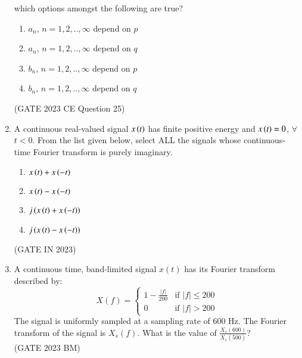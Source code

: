 \begin{enumerate}[label=\thechapter.\arabic*,ref=\thechapter.\theenumi]
which options amongst the following are true?
\begin{enumerate}[label=(\alph*)]
    \item $a_n$, $n=1,2,..,\infty$ depend on $p$
    \item $a_n$, $n=1,2,..,\infty$ depend on $q$
    \item $b_n$, $n=1,2,..,\infty$ depend on $p$
    \item $b_n$, $n=1,2,..,\infty$ depend on $q$
\end{enumerate}
\hfill(GATE 2023 CE Question 25)\\
\solution
\newpage
\item A continuous real-valued signal $x\left(t\right)$ has finite positive energy and $x\left(t\right) = 0$, $\forall$ $t < 0$. From the list given below, select ALL the signals whose
continuous-time Fourier transform is purely imaginary.\\
\begin{enumerate}
\item$x\left(t\right) + x\left(-t\right)$
\item$x\left(t\right) - x\left(-t\right)$
\item$j\left(x\left(t\right) + x\left(-t\right)\right)$
\item$j\left(x\left(t\right) - x\left(-t\right)\right)$
\end{enumerate}
\hfill{(GATE IN 2023)}\\
\solution
\newpage
\item A continuous time, band-limited signal $x(t)$ has its Fourier transform described by:
\[ X(f) = \begin{cases} 
1 - \frac{|f|}{200} & \text{if } |f| \leq 200 \\
0 & \text{if } |f| > 200 
\end{cases} \]
The signal is uniformly sampled at a sampling rate of 600 Hz. The Fourier transform of the signal is $X_s(f)$. What is the value of $\frac{X_s(600)}{X_s(500)}$? \\\hfill{(GATE 2023 BM)}
\solution
\newpage
\end{enumerate}
